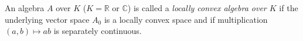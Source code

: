 An algebra $A$ over $K$ ($K = \mathbb{R}$ or $\mathbb{C}$) is called a \emph{locally convex algebra over $K$} if the underlying vector space $A_0$ is a locally convex space and if multiplication $(a, b) \mapsto ab$ is separately continuous.
